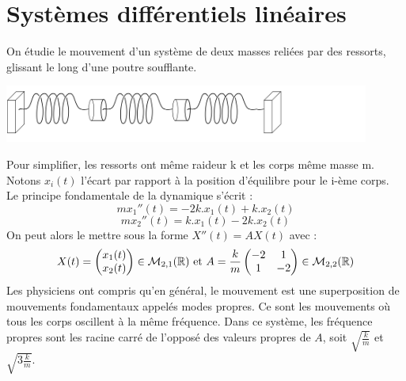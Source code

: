 \documentclass{book}
\begin{document}
\section{Systèmes différentiels linéaires}
On étudie le mouvement d'un système de deux masses reliées par des ressorts, glissant le long d'une poutre soufflante.
\begin{center}
\includegraphics[width=12cm]{resort.png}
\end{center}
Pour simplifier, les ressorts ont même raideur k et les corps même masse m.
Notons $x_i(t)$ l'écart par rapport à la position d'équilibre pour le i-ème corps.\\
Le principe fondamentale de la dynamique s'écrit :
$$m x_1''(t) = -2k.x_1(t)  +k.x_2(t)$$
$$m x_2''(t) = k.x_1(t)  - 2k.x_2(t)$$
On peut alors le mettre sous la forme $ X''(t)= AX(t)$
 avec :
 $$X(t)=\begin{pmatrix} x_1(t)\\x_2(t) \end{pmatrix}\in \mathcal{M}_{2,1}(\mathbb{R})\text{ et }A=\frac k m \begin{pmatrix}
 -2&1\\1&-2\\
 \end{pmatrix}\in\mathcal{M}_{2,2}(\mathbb{R}) $$
Les physiciens ont compris qu'en général, le mouvement est une superposition de mouvements
fondamentaux appelés modes propres. Ce sont les mouvements où tous les corps oscillent à la
même fréquence. Dans ce système, les fréquence propres sont les racine carré de l'opposé des valeurs propres  de $A$, soit $\sqrt{\frac{k}{m}}$ et $\sqrt{3\frac{k}{m}}$.
\end{document}
